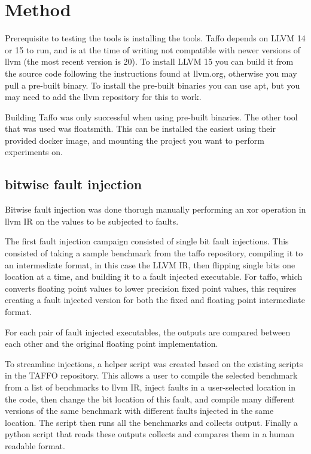 \section{Method}
Prerequisite to testing the tools is installing the tools. Taffo depends on LLVM 14 or 15 to run, and is at the time of writing not compatible with newer versions of llvm (the most recent version is 20). To install LLVM 15 you can build it from the source code following the instructions found at llvm.org, otherwise you may pull a pre-built binary. To install the pre-built binaries you can use apt, but you may need to add the llvm repository for this to work. 

Building Taffo was only successful when using pre-built binaries. 
The other tool that was used was floatsmith. This can be installed the easiest using their provided docker image, and mounting the project you want to perform experiments on.

\subsection{bitwise fault injection}
Bitwise fault injection was done thorugh manually performing an xor operation in llvm IR on the values to be subjected to faults.


The first fault injection campaign consisted of single bit fault injections. This consisted of taking a sample benchmark from the taffo repository, compiling it to an intermediate format, in this case the LLVM IR, then flipping single bits one location at a time, and building it to a fault injected executable. For taffo, which converts floating point values to lower precision fixed point values, this requires creating a fault injected version for both the fixed and floating point intermediate format.

For each pair of fault injected executables, the outputs are compared between each other and the original floating point implementation.

To streamline injections, a helper script was created based on the existing scripts in the TAFFO repository. This allows a user to compile the selected benchmark from a list of benchmarks to llvm IR, inject faults in a user-selected location in the code, then change the bit location of this fault, and compile many different versions of the same benchmark with different faults injected in the same location. The script then runs all the benchmarks and collects output. Finally a python script that reads these outputs collects and compares them in a human readable format.


